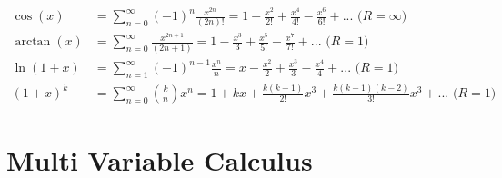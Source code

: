 \documentclass[reqno,11pt]{amsart}
\theoremstyle{definition}
\theoremstyle{remark}
\begin{document}
\begin{itemize}[noitemsep]
\begin{align}
		\cos (x) & = \sum_{n=0}^\infty (-1)^n \frac{x^{2n}}{(2n)!} = 1 - \frac{x^2}{2!} + \frac{x^4}{4!} - \frac{x^6}{6!} + ... \text{ ($R=\infty$) } \\
		\arctan(x) & = \sum_{n=0}^\infty \frac{x^{2n+1}}{(2n+1)} = 1 - \frac{x^3}{3} + \frac{x^5}{5!} - \frac{x^7}{7!} + ... \text{ ($R =1$)} \\
		\ln (1+x) & = \sum_{n=1}^\infty (-1)^{n-1} \frac{x^n}{n} = x - \frac{x^2}{2} + \frac{x^3}{3} - \frac{x^4}{4} + ... \text{ ($R=1$) } \\
		(1+x)^k & = \sum_{n=0}^\infty \binom{k}{n} x^n = 1 + kx + \frac{k(k-1)}{2!}x^3 + \frac{k(k-1)(k-2)}{3!}x^3 + ... \text{ ($R=1$)} 
	\end{align}

\end{itemize}

\section{Multi Variable Calculus}
\end{document}
